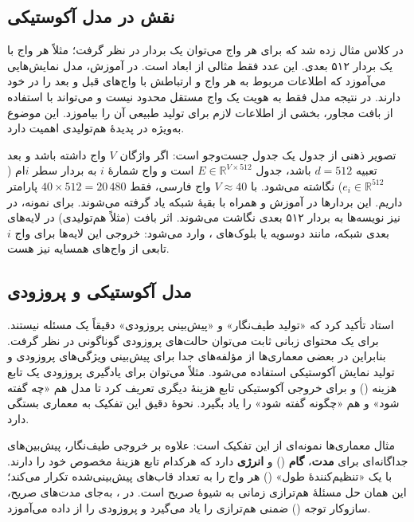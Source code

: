 \subsection{نقش  در مدل آکوستیکی}
در کلاس مثال زده شد که برای هر واج می‌توان یک بردار  در نظر گرفت؛ مثلاً هر واج با یک بردار ۵۱۲ بعدی. این عدد فقط مثالی از ابعاد  است. در آموزش، مدل نمایش‌هایی می‌آموزد که اطلاعات مربوط به هر واج و ارتباطش با واج‌های قبل و بعد را در خود دارند. در نتیجه مدل فقط به هویت یک واج مستقل محدود نیست و می‌تواند با استفاده از بافت مجاور، بخشی از اطلاعات لازم برای تولید طبیعی آن را بیاموزد. این موضوع به‌ویژه در پدیدهٔ هم‌تولیدی اهمیت دارد.

\begin{addedbox}{تصویر ذهنی از جدول }
 یک جدول جست‌وجو است: اگر واژگان $V$ واج داشته باشد و بعد تعبیه $d=512$ باشد، جدول $E \in \mathbb{R}^{V \times 512}$ است و واج شمارهٔ $i$ به بردار سطر $i$ام ($e_i\in\mathbb{R}^{512}$) نگاشته می‌شود. با $V \approx 40$ واج فارسی، فقط $40 \times 512 = 20\,480$ پارامتر داریم. این بردارها در آموزش و همراه با بقیهٔ شبکه یاد گرفته می‌شوند. برای نمونه، در  نیز نویسه‌ها به بردار ۵۱۲ بعدی نگاشت می‌شوند. اثر بافت (مثلاً هم‌تولیدی) در لایه‌های بعدی شبکه، مانند  دوسویه یا بلوک‌های ، وارد می‌شود: خروجی این لایه‌ها برای واج $i$ تابعی از واج‌های همسایه نیز هست.
\end{addedbox}

\subsection{مدل آکوستیکی و پروزودی}
استاد تأکید کرد که «تولید طیف‌نگار» و «پیش‌بینی پروزودی» دقیقاً یک مسئله نیستند. برای یک محتوای زبانی ثابت می‌توان حالت‌های پروزودی گوناگونی در نظر گرفت. بنابراین در بعضی معماری‌ها از مؤلفه‌های جدا برای پیش‌بینی ویژگی‌های پروزودی و تولید نمایش آکوستیکی استفاده می‌شود. مثلاً می‌توان برای یادگیری پروزودی یک تابع هزینه () و برای خروجی آکوستیکی تابع هزینهٔ دیگری تعریف کرد تا مدل هم «چه گفته شود» و هم «چگونه گفته شود» را یاد بگیرد. نحوهٔ دقیق این تفکیک به معماری بستگی دارد.

\begin{addedbox}{مثال معماری‌ها}
 نمونه‌ای از این تفکیک است: علاوه بر خروجی طیف‌نگار، پیش‌بین‌های جداگانه‌ای برای \textbf{مدت}، \textbf{گام} () و \textbf{انرژی} دارد که هرکدام تابع هزینهٔ مخصوص خود را دارند.  با یک «تنظیم‌کنندهٔ طول» () هر واج را به تعداد قاب‌های پیش‌بینی‌شده تکرار می‌کند؛ این همان حل مسئلهٔ هم‌ترازی زمانی به شیوهٔ صریح است. در ، به‌جای مدت‌های صریح، سازوکار توجه () ضمنی هم‌ترازی را یاد می‌گیرد و پروزودی را از داده می‌آموزد.
\end{addedbox}

